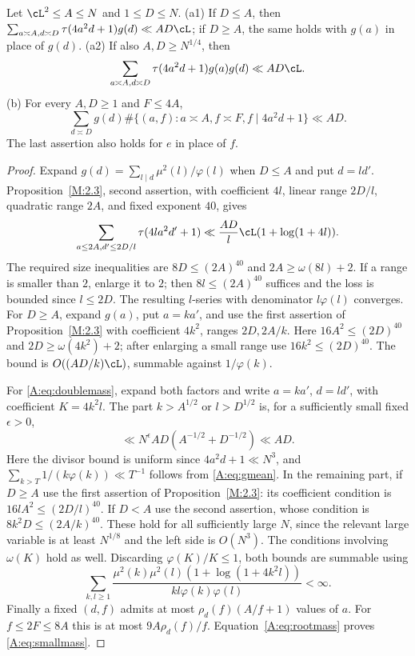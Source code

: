 \begin{lemma}\label{L:8.4}
Let $\cL^2\le A\le N$ and $1\le D\le N$.
\textup{(a1)} If $D\le A$, then
$\sum_{a\asymp A,d\asymp D}\tau(4a^2d+1)g(d)\ll AD\cL$;
if $D\ge A$, the same holds with $g(a)$ in place of $g(d)$.
\textup{(a2)} If also $A,D\ge N^{1/4}$, then
\begin{equation}\label{A:eq:doublemass}
 \sum_{a\asymp A,d\asymp D}\tau(4a^2d+1)g(a)g(d)\ll AD\cL.
\end{equation}
\textup{(b)} For every $A,D\ge1$ and $F\le4A$,
\begin{equation}\label{A:eq:smallmass}
 \sum_{d\asymp D}g(d)\#\{(a,f):a\asymp A,f\asymp F,
                                    f\mid4a^2d+1\}\ll AD.
\end{equation}
The last assertion also holds for $e$ in place of $f$.
\end{lemma}
\begin{proof}
Expand $g(d)=\sum_{l\mid d}\mu^2(l)/\varphi(l)$ when $D\le A$ and put
$d=ld'$. Proposition~\ref{M:2.3}, second assertion, with coefficient $4l$,
linear range $2D/l$, quadratic range $2A$, and fixed exponent $40$, gives
\[
 \sum_{a\le2A,d'\le2D/l}\tau(4la^2d'+1)
       \ll\frac{AD}{l}\cL(1+\log(1+4l)).
\]
The required size inequalities are $8D\le(2A)^{40}$ and
$2A\ge\omega(8l)+2$. If a range is smaller than $2$, enlarge it to $2$;
then $8l\le(2A)^{40}$ suffices and the loss is bounded since $l\le2D$.
The resulting $l$-series with denominator $l\varphi(l)$ converges.
For $D\ge A$, expand $g(a)$, put $a=ka'$, and use the first assertion of
Proposition~\ref{M:2.3} with coefficient $4k^2$, ranges $2D,2A/k$.
Here $16A^2\le(2D)^{40}$ and $2D\ge\omega(4k^2)+2$; after enlarging a
small range use $16k^2\le(2D)^{40}$. The bound is
$O((AD/k)\cL)$, summable against $1/\varphi(k)$.

For \eqref{A:eq:doublemass}, expand both factors and write $a=ka'$,
$d=ld'$, with coefficient $K=4k^2l$. The part $k>A^{1/2}$ or
$l>D^{1/2}$ is, for a sufficiently small fixed $\epsilon>0$,
\[
 \ll N^\epsilon AD(A^{-1/2}+D^{-1/2})\ll AD.
\]
Here the divisor bound is uniform since $4a^2d+1\ll N^3$, and
$\sum_{k>T}1/(k\varphi(k))\ll T^{-1}$ follows from
\eqref{A:eq:gmean}. In the remaining part, if $D\ge A$ use the first
assertion of Proposition~\ref{M:2.3}: its coefficient condition is
$16lA^2\le(2D/l)^{40}$. If $D<A$ use the second assertion, whose condition
is $8k^2D\le(2A/k)^{40}$. These hold for all sufficiently large $N$,
since the relevant large variable is at least $N^{1/8}$ and the left
side is $O(N^3)$. The conditions involving $\omega(K)$ hold as well.
Discarding $\varphi(K)/K\le1$, both bounds are summable using
\[
 \sum_{k,l\ge1}\frac{\mu^2(k)\mu^2(l)(1+\log(1+4k^2l))}
                         {kl\varphi(k)\varphi(l)}<\infty.
\]
Finally a fixed $(d,f)$ admits at most $\rho_d(f)(A/f+1)$ values of $a$.
For $f\le2F\le8A$ this is at most $9A\rho_d(f)/f$.
Equation~\eqref{A:eq:rootmass} proves \eqref{A:eq:smallmass}.
\end{proof}

